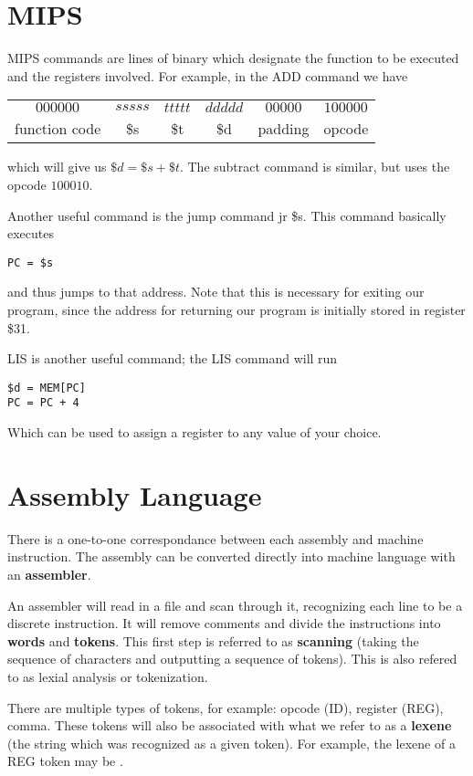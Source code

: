 \documentclass[12pt]{article}
\begin{document}
\section*{MIPS}
MIPS commands are lines of binary which designate the function to be executed and the registers involved. For example, in the ADD command we have \newline
\begin{table}[ht]
\centering
\begin{tabular}{cccccc}
  $000000$ & $sssss$ & $ttttt$ & $ddddd$ & $00000$ & $100000$ \\
  function code & \$s & \$t & \$d & padding & opcode \\
  \end{tabular}
\end{table}

which will give us $\$d = \$s + \$t$. The subtract command is similar, but uses the opcode $100010$.

Another useful command is the jump command jr \$s. This command basically executes
\begin{verbatim}
PC = $s
\end{verbatim}
and thus jumps to that address. Note that this is necessary for exiting our program, since the address for returning our program is initially stored in register \$31.

LIS is another useful command; the LIS command will run
\begin{verbatim}
$d = MEM[PC]
PC = PC + 4
\end{verbatim}
Which can be used to assign a register to any value of your choice.

\section*{Assembly Language}
There is a one-to-one correspondance between each assembly and machine instruction. The assembly can be converted directly into machine language with an {\bf assembler}.

An assembler will read in a file and scan through it, recognizing each line to be a discrete instruction. It will remove comments and divide the instructions into {\bf words} and {\bf tokens}. This first step is referred to as {\bf scanning} (taking the sequence of characters and outputting a sequence of tokens). This is also refered to as lexial analysis or tokenization.

There are multiple types of tokens, for example: opcode (ID), register (REG), comma. These tokens will also be associated with what we refer to as a {\bf lexene} (the string which was recognized as a given token). For example, the lexene of a REG token may be .
\end{document}
